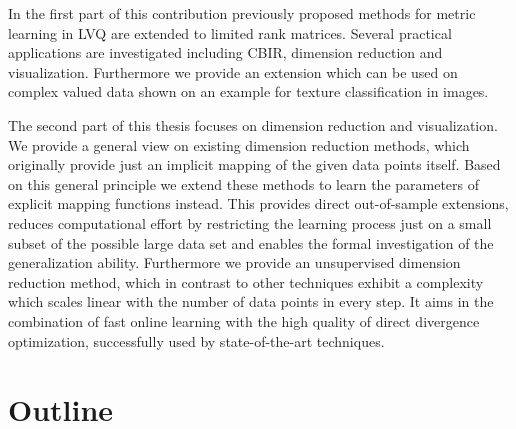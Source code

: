 In the first part of this contribution previously proposed methods for metric learning in \ac{LVQ} are extended to limited rank matrices. 
Several practical applications are investigated including \ac{CBIR}, dimension reduction and visualization. 
Furthermore we provide an extension which can be used on complex valued data shown on an example for texture classification in images. 

The second part of this thesis focuses on dimension reduction and visualization. 
We provide a general view on existing dimension reduction methods, 
which originally provide just an implicit mapping of the given data points itself. 
Based on this general principle we extend these methods to learn the parameters of explicit mapping functions instead. 
This provides direct out-of-sample extensions, reduces computational effort by restricting the learning process just on a small 
subset of the possible large data set and enables the formal investigation of the generalization ability. 
Furthermore we provide an unsupervised dimension reduction method, which in contrast to other techniques exhibit 
a complexity which scales linear with the number of data points in every step. 
It aims in the combination of fast online learning with the high quality of direct divergence optimization, 
successfully used by state-of-the-art techniques.  

\section{Outline}

